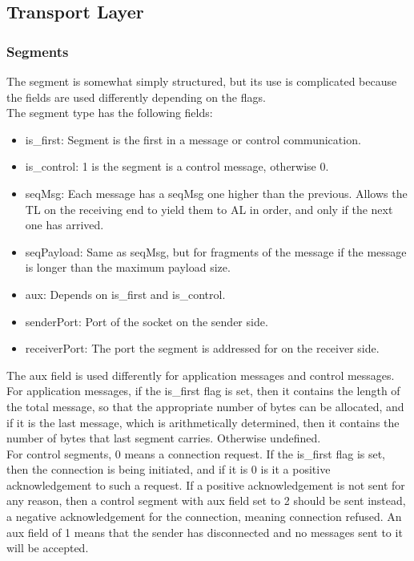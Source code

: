 \subsection{Transport Layer}
\subsubsection{Segments}
The segment is somewhat simply structured, but its use is complicated because the fields are used differently depending on the flags.\\
The segment type has the following fields:
\begin{itemize}
\item is\_first: Segment is the first in a message or control communication.
\item is\_control: 1 is the segment is a control message, otherwise 0.
\item seqMsg: Each message has a seqMsg one higher than the previous. Allows the TL on the receiving end to yield them to AL in order, and only if the next one has arrived.
\item seqPayload: Same as seqMsg, but for fragments of the message if the message is longer than the maximum payload size.
\item aux: Depends on is\_first and is\_control.
\item senderPort: Port of the socket on the sender side.
\item receiverPort: The port the segment is addressed for on the receiver side.
\end{itemize}

The aux field is used differently for application messages and control messages. For application messages, if the is\_first flag is set, then it contains the length of the total message, so that the appropriate number of bytes can be allocated, and if it is the last message, which is arithmetically determined, then it contains the number of bytes that last segment carries. Otherwise undefined.\\
For control segments, 0 means a connection request. If the is\_first flag is set, then the connection is being initiated, and if it is 0 is it a positive acknowledgement to such a request. If a positive acknowledgement is not sent for any reason, then a control segment with aux field set to 2 should be sent instead, a negative acknowledgement for the connection, meaning connection refused. An aux field of 1 means that the sender has disconnected and no messages sent to it will be accepted.

